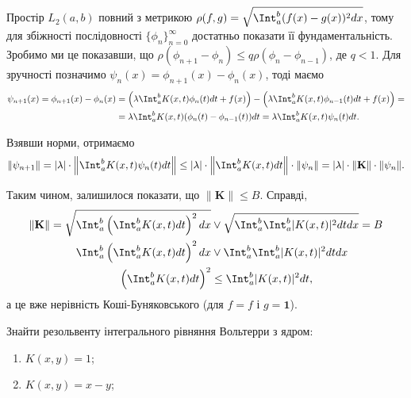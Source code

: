 \begin{solution}
    Простір $L_2(a, b)$ повний з метрикою $\rho(f, g) = \sqrt{\Int_a^b (f(x) - g(x))^2 dx}$, тому для збіжності послідовності $\{\phi_n\}_{n = 0}^\infty$  достатньо показати її фундаментальність.\\
    
    Зробимо ми це показавши, що $\rho(\phi_{n + 1} - \phi_n) \le q \rho(\phi_n - \phi_{n - 1})$, де $q < 1$. Для зручності позначимо $\psi_n(x) = \phi_{n + 1}(x) - \phi_n(x)$, тоді маємо
    \begin{equation*}
        \begin{split}
            \psi_{n + 1}(x) = \phi_{n + 1}(x) - \phi_n(x) &= \left(\lambda \Int_a^b K(x, t) \phi_n (t) dt + f(x)\right) - \left(\lambda \Int_a^b K(x, t) \phi_{n - 1} (t) dt + f(x)\right) = \\ 
            &= \lambda \Int_a^b K(x, t) (\phi_n(t) - \phi_{n - 1}(t)) dt = \lambda \Int_a^b K(x, t) \psi_n(t) dt.
        \end{split}
    \end{equation*}
    
    Взявши норми, отримаємо 
    \[
        \|\psi_{n+1}\| = |\lambda| \cdot \left\|\Int_a^b K(x, t) \psi_n(t) dt \right\| \le |\lambda| \cdot \left\|\Int_a^b K(x, t) dt\right\| \cdot \|\psi_n\| = |\lambda| \cdot \|\textbf{K}\| \cdot \|\psi_n\|. 
    \] 
    
    Таким чином, залишилося показати, що $\|\textbf{K}\| \le B$. Справді, 
    \begin{equation*}
        \begin{split}
            \|\textbf{K}\| = \sqrt{\Int_a^b \left(\Int_a^b K(x, t) dt\right)^2 dx} &\lor \sqrt{\Int_a^b \Int_a^b |K(x, t)|^2 dt dx} = B \\
            \Int_a^b \left(\Int_a^b K(x, t) dt\right)^2 dx &\lor \Int_a^b \Int_a^b |K(x, t)|^2 dt dx \\
            \left(\Int_a^b K(x, t) dt\right)^2 &\le \Int_a^b |K(x, t)|^2 dt,
        \end{split}    
    \end{equation*}
    а це вже нерівність Коші-Буняковського (для $f = f$ і $g = \textbf{1}$).
\end{solution}

\begin{problem}[Владимиров, 5.11]
    Знайти резольвенту інтегрального рівняння Вольтерри з ядром:
    \begin{enumerate}
        \item $K(x, y) = 1$;
        \item $K(x, y) = x - y$;
    \end{enumerate}
\end{problem}

